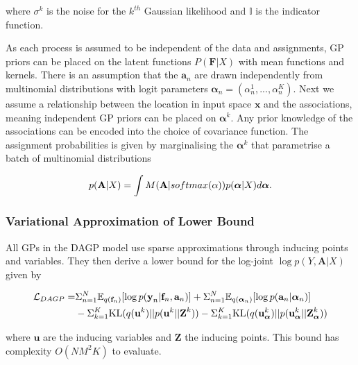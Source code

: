 \documentclass[12pt,a4paper]{report}
\theoremstyle{definition}
\begin{document}
where $\sigma^k$ is the noise for the $k^{th}$ Gaussian likelihood and $\mathbb{I}$ is the indicator function.

As each process is assumed to be independent of the data and assignments, GP priors can be placed on the latent functions $P(\textbf{F} | X)$ with mean functions and kernels.
There is an assumption that the $\textbf{a}_{n}$ are drawn independently from multinomial distributions with logit parameters $\boldsymbol{\alpha}_{n} = (\alpha_{n}^1, ... , \alpha_{n}^K)$. 
Next we assume a relationship between the location in input space $\textbf{x}$ and the associations, meaning independent GP priors can be placed on $\boldsymbol{\alpha}^k$.
Any prior knowledge of the associations can be encoded into the choice of covariance function.
The assignment probabilities is given by marginalising the $\boldsymbol{\alpha}^k$ that parametrise a batch of multinomial distributions

\begin{equation}
	\centering 
	p(\textbf{A} | X) = \int M(\textbf{A} | softmax({\alpha})) p(\boldsymbol{\alpha} | X) d\boldsymbol{\alpha}.
\end{equation}

\subsubsection{Variational Approximation of Lower Bound}

All GPs in the DAGP model use sparse approximations through inducing points and variables.
They then derive a lower bound for the log-joint $\log p(Y, \textbf{A} | X)$ given by

\begin{equation}
	\begin{aligned}
		\centering
		\mathcal{L}_{DAGP} = &\Sigma_{n=1}^{N} \mathbb{E}_{q(\textbf{f}_{n})} [\log p(\textbf{y}_{n} | \textbf{f}_{n}, \textbf{a}_{n})]  + \Sigma_{n=1}^{N} \mathbb{E}_{q(\boldsymbol{\alpha}_{n})} [\log p(\textbf{a}_{n} | \boldsymbol{\alpha}_{n})]  \\
		&- \Sigma_{k=1}^{K} \textrm{KL}(q(\textbf{u}^k) || p(\textbf{u}^k || \textbf{Z}^k)) - \Sigma_{k=1}^{K} \textrm{KL}(q(\textbf{u}_{\boldsymbol{\alpha}}^k) || p(\textbf{u}_{\boldsymbol{\alpha}}^k || \textbf{Z}_{\boldsymbol{\alpha}}^k))
	\end{aligned}
\end{equation}

where $\textbf{u}$ are the inducing variables and $\textbf{Z}$ the inducing points.
This bound has complexity $O(NM^2K)$ to evaluate.
\end{document}
